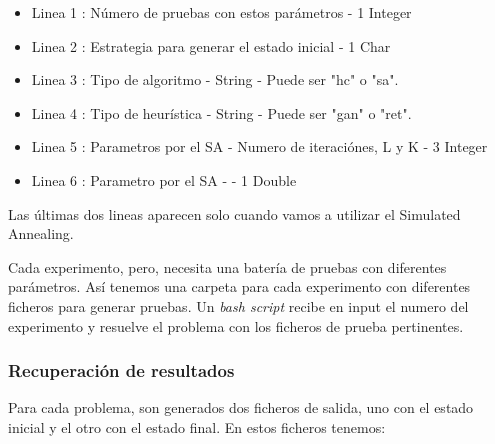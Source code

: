 \documentclass{article}
\begin{document}
\begin{itemize}
\item Linea 1 : Número de pruebas con estos parámetros - 1 Integer
\item Linea 2 : Estrategia para generar el estado inicial - 1 Char
\item Linea 3 : Tipo de algoritmo - String - Puede ser "hc" o "sa".
\item Linea 4 : Tipo de heurística - String - Puede ser "gan" o "ret".
\item Linea 5 : Parametros por el SA - Numero de iteraciónes, L y K - 3 Integer
\item Linea 6 : Parametro por el SA -  - 1 Double
\end{itemize}

Las últimas dos lineas aparecen solo cuando vamos a utilizar el Simulated Annealing. 

Cada experimento, pero, necesita una batería de pruebas con diferentes
parámetros. Así tenemos una carpeta para cada experimento con diferentes
ficheros para generar pruebas. Un {\it bash script} recibe en input el numero
del experimento y resuelve el problema con los ficheros de prueba pertinentes.

\subsubsection{Recuperación de resultados}

Para cada problema, son generados dos ficheros de salida, uno con el estado
inicial y el otro con el estado final. En estos ficheros tenemos:
\end{document}
